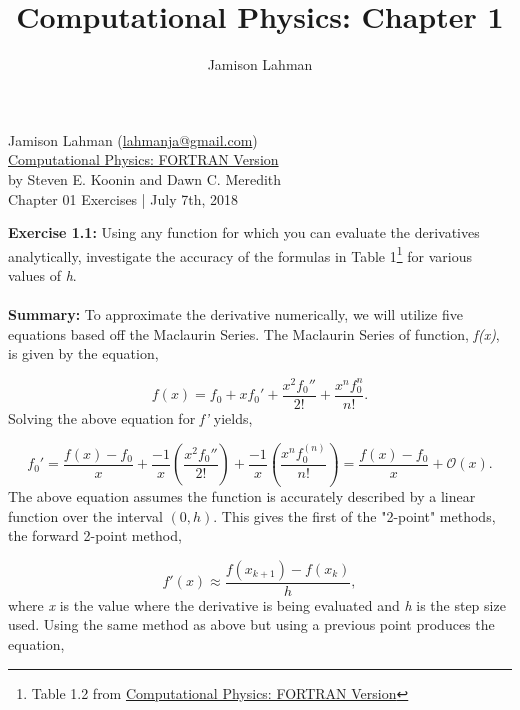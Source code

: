 \documentclass[10pt]{article}
\author{Jamison Lahman}
\title{Computational Physics: Chapter 1}
\begin{document}
\begin{flushright}Jamison Lahman (\href{mailto:lahmanja@gmail.com}{lahmanja@gmail.com}) \\
\href{https://www.amazon.com/Computational-Physics-Fortran-Steven-Koonin/dp/0201386232}{Computational Physics: FORTRAN Version} \\
by Steven E. Koonin and Dawn C. Meredith\\
Chapter 01 Exercises | July 7th, 2018 \\
\end{flushright}
\label{exercise:1.1}\textbf{Exercise 1.1:} Using any function for which you can evaluate the derivatives analytically, investigate the accuracy of the formulas in Table 1\footnote{Table 1.2 from \href{https://www.amazon.com/Computational-Physics-Fortran-Steven-Koonin/dp/0201386232}{Computational Physics: FORTRAN Version}} for various values of \textit{h}. \\
\\
\label{summary:1.1}\textbf{Summary:} To approximate the derivative numerically, we will utilize five equations based off the Maclaurin Series. The Maclaurin Series of function, \textit{f(x)}, is given by the equation,

\begin{equation}
	f(x) = f_0 +x f_0'+ \frac{x^2f_0''}{2!} + \frac{x^nf_0^{n}}{n!}.
\end{equation}
Solving the above equation for \textit{f'} yields,

\begin{equation}
	f_0' = \frac{f(x)-f_0}{x}+\frac{-1}{x}\left(\frac{x^2f_0''}{2!} \right)+ \frac{-1}{x} \left(\frac{x^nf_0^{(n)}}{n!}\right) =  \frac{f(x)-f_0}{x}  + \mathcal{O}(x).
\end{equation}
The above equation assumes the function is accurately described by a linear function over the interval $(0,h)$. This gives the first of the "2-point" methods, the forward 2-point method,

\begin{equation}
\label{eq:forward2}
	f'(x) \approx \frac{f(x_{k+1})-f(x_k)}{h},
\end{equation}
where \textit{x} is the value where the derivative is being evaluated and \textit{h} is the step size used. Using the same method as above but using a previous point produces the equation,
\end{document}
